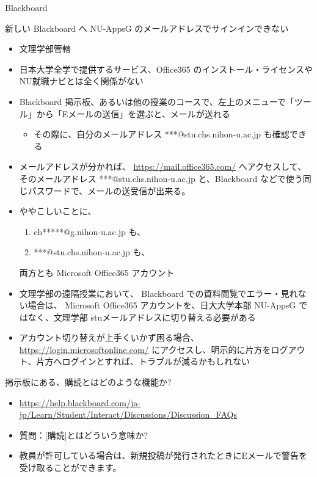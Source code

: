 \documentclass[a4j,10pt]{jsarticle}
\begin{document}
{\begin{frame}[label={sec:org166405d},fragile]{Blackboard}
\begin{block}{新しい Blackboard へ NU-AppsG のメールアドレスでサインインできない}
\begin{itemize}
\begin{itemize}
\item 文理学部管轄
\item 日本大学全学で提供するサービス、Office365 のインストール・ライセンスや NU就職ナビとは全く関係がない
\item Blackboard 掲示板、あるいは他の授業のコースで、左上のメニューで「ツール」から「Eメールの送信」を選ぶと、メールが送れる
\begin{itemize}
\item その際に、自分のメールアドレス ***@stu.chs.nihon-u.ac.jp も確認できる
\end{itemize}
\item メールアドレスが分かれば、 \url{https://mail.office365.com/} へアクセスして、そのメールアドレス ***@stu.chs.nihon-u.ac.jp と、Blackboard などで使う同じパスワードで、メールの送受信が出来る。
\end{itemize}
\end{itemize}
\par
\begin{itemize}
\item ややこしいことに、
\begin{enumerate}
\item ch*****@g.nihon-u.ac.jp も、
\item ***@stu.chs.nihon-u.ac.jp も、
\end{enumerate}
両方とも Microsoft Office365 アカウント
\par
\item 文理学部の遠隔授業において、 Blackboard での資料閲覧でエラー・見れない場合は、
Microsoft Office365 アカウントを、日大大学本部 NU-AppsG ではなく、文理学部 stuメールアドレスに切り替える必要がある
\par
\item アカウント切り替えが上手くいかず困る場合、 \url{https://login.microsoftonline.com/} にアクセスし、明示的に片方をログアウト、片方へログインとすれば、トラブルが減るかもしれない
\end{itemize}
\end{block}
\par
\begin{block}{掲示板にある、購読とはどのような機能か?}
\begin{itemize}
\item \url{https://help.blackboard.com/ja-jp/Learn/Student/Interact/Discussions/Discussion\_FAQs}
\item 質問：[購読]とはどういう意味か?
\item 教員が許可している場合は、新規投稿が発行されたときにEメールで警告を受け取ることができます。

\end{itemize}
\end{block}
\end{frame}}
\end{document}

